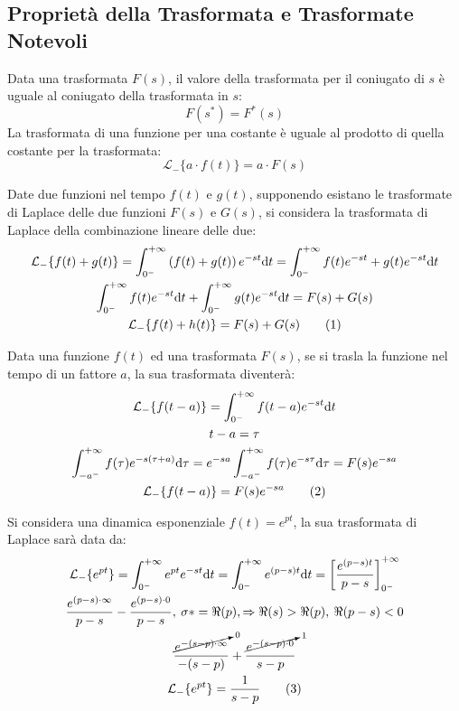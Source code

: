 \documentclass{article}
\numberwithin{equation}{subsection}
\newcommand{\df}{\mathrm{d}}
\newcommand{\tageq}{\tag{\stepcounter{equation}\theequation}}
\begin{document}
\subsection{Proprietà della Trasformata e Trasformate Notevoli}

Data una trasformata $F(s)$, il valore della trasformata per il coniugato di $s$ è uguale al coniugato della trasformata in $s$:
\begin{equation}
    F(s^*)=F^*(s)
\end{equation}
La trasformata di una funzione per una costante è uguale al prodotto di quella costante per la trasformata:
\begin{equation}
    \mathcal{L}_-\{a\cdot f(t)\}=a\cdot F(s)
\end{equation} 

Date due funzioni nel tempo $f(t)$ e $g(t)$, supponendo esistano le trasformate di Laplace delle due funzioni $F(s)$ e $G(s)$, si considera la trasformata di Laplace 
della combinazione lineare delle due: 
\begin{gather*}
    \mathcal{L}_-\{f(t)+g(t)\}=\displaystyle\int_{0^-}^{+\infty}\left(f(t)+g(t)\right)e^{-st}\df t=\int_{0^-}^{+\infty}f(t)e^{-st}+g(t)e^{-st}\df t\\
    \displaystyle\int_{0^-}^{+\infty}f(t)e^{-st}\df t+\int_{0^-}^{+\infty}g(t)e^{-st}\df t=F(s)+G(s)\\
    \mathcal{L}_-\{f(t)+h(t)\}=F(s)+G(s)\tageq
\end{gather*}

Data una funzione $f(t)$ ed una trasformata $F(s)$, se si trasla la funzione nel tempo di un fattore $a$, la sua trasformata diventerà:
\begin{gather*}
    \mathcal{L}_-\{f(t-a)\}=\displaystyle\int_{0^-}^{+\infty}f(t-a)e^{-st}\df t\\
    t-a=\tau\\
    \displaystyle\int_{-a^-}^{+\infty}f(\tau)e^{-s(\tau+a)}\df\tau=e^{-sa}\int_{-a^-}^{+\infty}f(\tau)e^{-s\tau}\df\tau=F(s)e^{-sa}\\
    \mathcal{L}_-\{f(t-a)\}=F(s)e^{-sa}\tageq
\end{gather*}


Si considera una dinamica esponenziale $f(t)=e^{pt}$, la sua trasformata di Laplace sarà data da:
\begin{gather*}
    \mathcal{L}_-\{e^{pt}\}=\displaystyle\int_{0^-}^{+\infty}e^{pt}e^{-st}\df t=\int_{0^-}^{+\infty}e^{(p-s)t}\df t=\left[\frac{e^{(p-s)t}}{p-s}\right]^{+\infty}_{0^-}\\
    \displaystyle\frac{e^{(p-s)\cdot\infty}}{p-s}-\frac{e^{(p-s)\cdot0}}{p-s},\:\sigma*=\Re(p),\Rightarrow \Re(s)>\Re(p),\:\Re(p-s)<0\\
    \displaystyle\frac{\cancelto{0}{e^{-(s-p)\cdot\infty}}}{-(s-p)}+\frac{\cancelto{1}{e^{-(s-p)\cdot0}}}{s-p}\\
    \mathcal{L}_-\{e^{pt}\}=\displaystyle\frac{1}{s-p}\tageq
\end{gather*}
\end{document}
